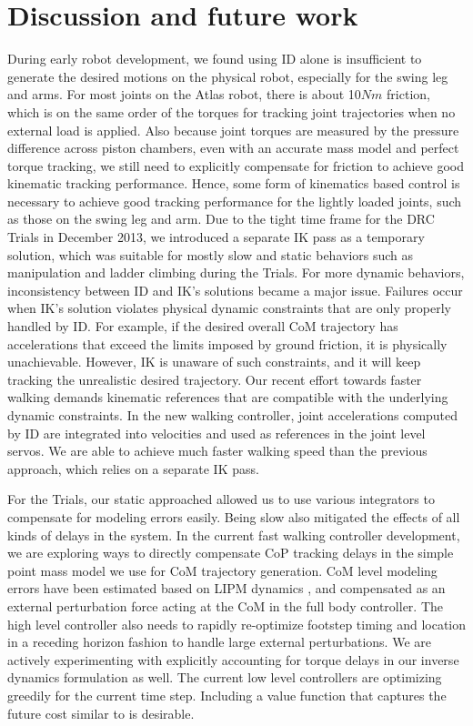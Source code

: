 \documentclass{ws-ijhr}
\begin{document}
\section{Discussion and future work}
\label{sec:dis}
During early robot development, we found using ID alone is 
insufficient to generate the desired motions on the physical robot, especially 
for the swing leg and arms. 
For most joints on the Atlas robot, there is about 10$Nm$ friction, which is
on the same order of the torques for tracking joint trajectories when no external
load is applied.
Also because joint torques are measured by the pressure difference across piston 
chambers, even with an accurate mass model and perfect torque tracking, we still
need to explicitly compensate for friction to achieve good kinematic tracking
performance. 
Hence, some form of kinematics based control is necessary to achieve good  
tracking performance for the lightly loaded joints, such as those on the swing 
leg and arm.
Due to the tight time frame for the DRC Trials in December 2013, we introduced
a separate IK pass as a temporary solution, which was suitable for mostly slow and
static behaviors such as manipulation and ladder climbing during the Trials. 
For more dynamic behaviors, inconsistency between ID and IK's solutions became 
a major issue. 
Failures occur when IK's solution violates physical dynamic constraints that are 
only properly handled by ID. 
For example, if the desired overall CoM trajectory has accelerations that 
exceed the limits imposed by ground friction, it is physically unachievable. 
However, IK is unaware of such constraints, and it will keep tracking the 
unrealistic desired trajectory. 
Our recent effort towards faster walking demands kinematic references that are 
compatible with the underlying dynamic constraints. 
In the new walking controller, joint accelerations computed by ID are 
integrated into velocities and used as references in the joint level servos. 
We are able to achieve much faster walking speed than the previous approach, 
which relies on a separate IK pass. 

For the Trials, our static approached allowed us to use various integrators to 
compensate for modeling errors easily. 
Being slow also mitigated the effects of all kinds of delays in the system. 
In the current fast walking controller development, we are exploring ways to 
directly compensate CoP tracking delays in the simple point mass model we use 
for CoM trajectory generation. 
CoM level modeling errors have been estimated based on LIPM 
dynamics \cite{benx_proposal}, and compensated as an external perturbation 
force acting at the CoM \cite{sfeng_proposal} in the full body controller.
The high level controller also needs to rapidly re-optimize footstep timing and
location in a receding horizon fashion to handle large external perturbations. 
We are actively experimenting with explicitly accounting for torque delays in 
our inverse dynamics formulation as well. 
The current low level controllers are optimizing greedily for the current 
time step. 
Including a value function that captures the future cost similar to 
\cite{scott_qp} is desirable. 
\end{document}
